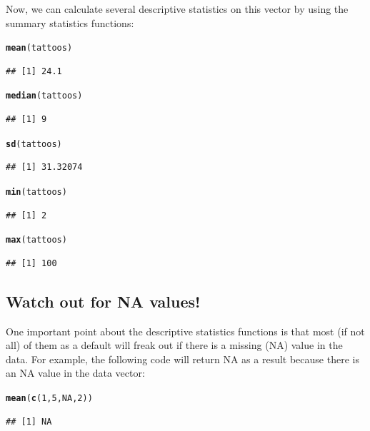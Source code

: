 \documentclass{tufte-book}\usepackage[]{graphicx}\usepackage[]{color}
\makeatletter
\newcommand{\hlnum}[1]{\textcolor[rgb]{0.686,0.059,0.569}{#1}}%
\newcommand{\hlstd}[1]{\textcolor[rgb]{0.345,0.345,0.345}{#1}}%
\newcommand{\hlkwd}[1]{\textcolor[rgb]{0.737,0.353,0.396}{\textbf{#1}}}%
\newenvironment{kframe}{%
 \def\at@end@of@kframe{}%
 \ifinner\ifhmode%
  \def\at@end@of@kframe{\end{minipage}}%
  \begin{minipage}{\columnwidth}%
 \fi\fi%
 \def\FrameCommand##1{\hskip\@totalleftmargin \hskip-\fboxsep
 \colorbox{shadecolor}{##1}\hskip-\fboxsep
     \hskip-\linewidth \hskip-\@totalleftmargin \hskip\columnwidth}%
 \MakeFramed {\advance\hsize-\width
   \@totalleftmargin\z@ \linewidth\hsize
   \@setminipage}}%
 {\par\unskip\endMakeFramed%
 \at@end@of@kframe}
\newenvironment{knitrout}{}{} %
\makeatother
\begin{document}
Now, we can calculate several descriptive statistics on this vector by using the summary statistics functions:

\begin{knitrout}
\color{fgcolor}\begin{kframe}
\begin{alltt}
\hlkwd{mean}\hlstd{(tattoos)}
\end{alltt}
\begin{verbatim}
## [1] 24.1
\end{verbatim}
\begin{alltt}
\hlkwd{median}\hlstd{(tattoos)}
\end{alltt}
\begin{verbatim}
## [1] 9
\end{verbatim}
\begin{alltt}
\hlkwd{sd}\hlstd{(tattoos)}
\end{alltt}
\begin{verbatim}
## [1] 31.32074
\end{verbatim}
\begin{alltt}
\hlkwd{min}\hlstd{(tattoos)}
\end{alltt}
\begin{verbatim}
## [1] 2
\end{verbatim}
\begin{alltt}
\hlkwd{max}\hlstd{(tattoos)}
\end{alltt}
\begin{verbatim}
## [1] 100
\end{verbatim}
\end{kframe}
\end{knitrout}

\subsection{Watch out for NA values!}

One important point about the descriptive statistics functions is that most (if not all) of them as a default will freak out if there is a missing (NA) value in the data. For example, the following code will return NA as a result because there is an NA value in the data vector:


\begin{knitrout}
\color{fgcolor}\begin{kframe}
\begin{alltt}
\hlkwd{mean}\hlstd{(}\hlkwd{c}\hlstd{(}\hlnum{1}\hlstd{,} \hlnum{5}\hlstd{,} \hlnum{NA}\hlstd{,} \hlnum{2}\hlstd{))}
\end{alltt}
\begin{verbatim}
## [1] NA
\end{verbatim}
\end{kframe}
\end{knitrout}
\end{document}
